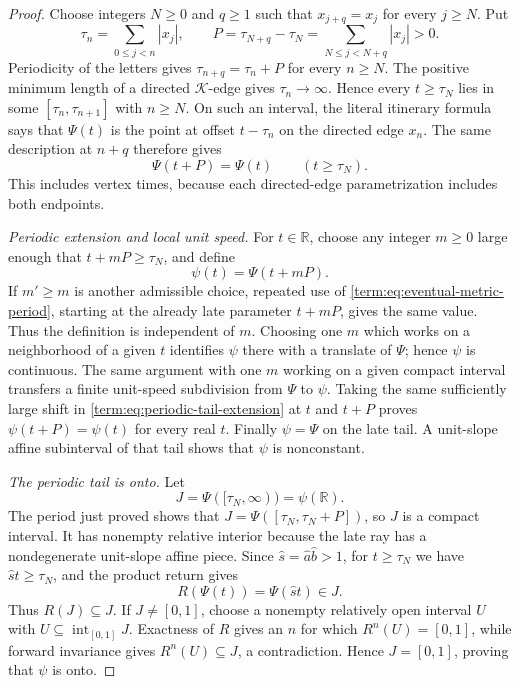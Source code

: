 \documentclass[11pt]{article}
\theoremstyle{definition}
\theoremstyle{remark}
\newcommand{\I}{[0,1]}
\begin{document}
\begin{proof}
Choose integers \(N\geq0\) and \(q\geq1\) such that
\(x_{j+q}=x_j\) for every \(j\geq N\).  Put
\[
 \tau_n=\sum_{0\leq j<n}|x_j|,
 \qquad
 P=\tau_{N+q}-\tau_N
   =\sum_{N\leq j<N+q}|x_j|>0.
\]
Periodicity of the letters gives
\(\tau_{n+q}=\tau_n+P\) for every \(n\geq N\).  The positive minimum length
of a directed \(\mathcal K\)-edge gives \(\tau_n\to\infty\).  Hence every
\(t\geq\tau_N\) lies in some \([\tau_n,\tau_{n+1}]\) with \(n\geq N\).
On such an interval, the literal itinerary formula says that
\(\Psi(t)\) is the point at offset \(t-\tau_n\) on the directed edge
\(x_n\).  The same description at \(n+q\) therefore gives
\begin{equation}\label{term:eq:eventual-metric-period}
 \Psi(t+P)=\Psi(t)\qquad(t\geq\tau_N).
\end{equation}
This includes vertex times, because each directed-edge parametrization
includes both endpoints.

\smallskip
\noindent\emph{Periodic extension and local unit speed.}
For \(t\in\mathbb R\), choose any integer \(m\geq0\) large enough that
\(t+mP\geq\tau_N\), and define
\begin{equation}\label{term:eq:periodic-tail-extension}
 \psi(t)=\Psi(t+mP).
\end{equation}
If \(m'\geq m\) is another admissible choice, repeated use of
\eqref{term:eq:eventual-metric-period}, starting at the already late
parameter \(t+mP\), gives the same value.  Thus the definition is
independent of \(m\).  Choosing one \(m\) which works on a neighborhood of a
given \(t\) identifies \(\psi\) there with a translate of \(\Psi\); hence
\(\psi\) is continuous.  The same argument with one \(m\) working on a
given compact interval transfers a finite unit-speed subdivision from
\(\Psi\) to \(\psi\).  Taking the same sufficiently large shift in
\eqref{term:eq:periodic-tail-extension} at \(t\) and \(t+P\) proves
\(\psi(t+P)=\psi(t)\) for every real \(t\).  Finally \(\psi=\Psi\) on the
late tail.  A unit-slope affine subinterval of that tail shows that
\(\psi\) is nonconstant.

\smallskip
\noindent\emph{The periodic tail is onto.}
Let
\[
 J=\Psi([\tau_N,\infty))=\psi(\mathbb R).
\]
The period just proved shows that \(J=\Psi([\tau_N,\tau_N+P])\), so \(J\)
is a compact interval.  It has nonempty relative interior because the late
ray has a nondegenerate unit-slope affine piece.  Since
\(\widehat s=\widehat a\widehat b>1\), for \(t\geq\tau_N\) we have
\(\widehat s t\geq\tau_N\), and the product return gives
\[
 R(\Psi(t))=\Psi(\widehat s t)\in J.
\]
Thus \(R(J)\subseteq J\).  If \(J\ne\I\), choose a nonempty relatively open
interval \(U\) with \(U\subseteq\operatorname{int}_{\I}J\).  Exactness of
\(R\) gives an \(n\) for which \(R^n(U)=\I\), while forward invariance gives
\(R^n(U)\subseteq J\), a contradiction.  Hence \(J=\I\), proving that
\(\psi\) is onto.


\end{proof}
\end{document}
